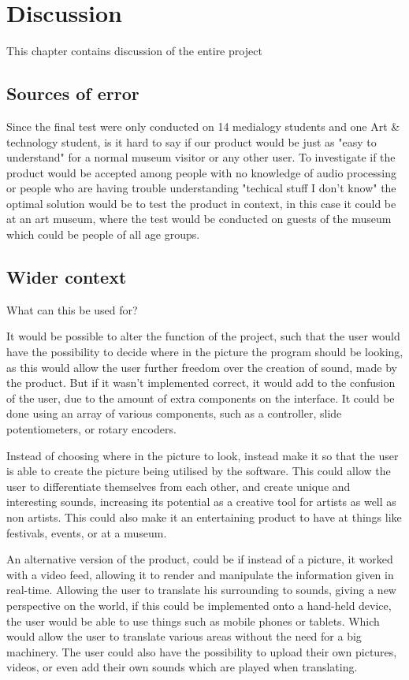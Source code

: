 \chapter{Discussion}\label{ch:discussion}
This chapter contains discussion of the entire project 

\section{Sources of error}

 Since the final test were only conducted on 14 medialogy students and one Art \& technology student, is it hard to say if our product would be just as "easy to understand" for a normal museum visitor or any other user. To investigate if the product would be accepted among people with no knowledge of audio processing or people who are having trouble understanding "techical stuff I don't know" the optimal solution would be to test the product in context, in this case it could be at an art museum, where the test would be conducted on guests of the museum which could be people of all age groups. 
 
\section{Wider context}
What can this be used for?

It would be possible to alter the function of the project, such that the user would have the possibility to decide where in the picture the program should be looking, as this would allow the user further freedom over the creation of sound, made by the product. But if it wasn't implemented correct, it would add to the confusion of the user, due to the amount of extra components on the interface. It could be done using an array of various components, such as a controller, slide potentiometers, or rotary encoders. 

Instead of choosing where in the picture to look, instead make it so that the user is able to create the picture being utilised by the software. This could allow the user to differentiate themselves from each other, and create unique and interesting sounds, increasing its potential as a creative tool for artists as well as non artists. This could also make it an entertaining product to have at things like festivals, events, or at a museum. 

An alternative version of the product, could be if instead of a picture, it worked with a video feed, allowing it to render and manipulate the information given in real-time. Allowing the user to translate his surrounding to sounds, giving a new perspective on the world, if this could be implemented onto a hand-held device, the user would be able to use things such as mobile phones or tablets. Which would allow the user to translate various areas without the need for a big machinery. 
The user could also have the possibility to upload their own pictures, videos, or even add their own sounds which are played when translating. 


